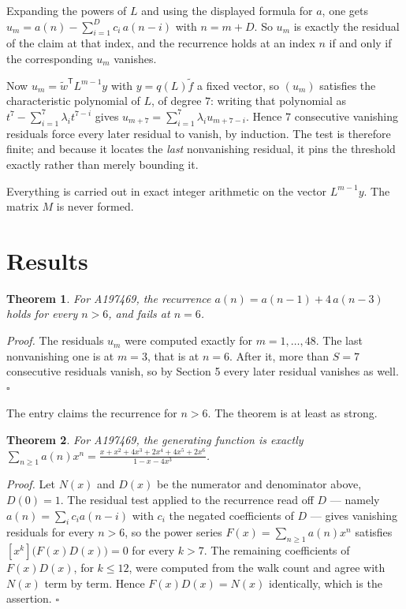 \documentclass[11pt]{article}
\newtheorem{theorem}{Theorem}
\theoremstyle{definition}
\begin{document}
Expanding the powers of $L$ and using the displayed formula for $a$, one gets $u_m = a(n) - \sum_{i=1}^{D} c_i\,a(n-i)$ with $n = m + D$. So $u_m$ is exactly the residual of the claim at that index, and the recurrence holds at an index $n$ if and only if the corresponding $u_m$ vanishes.

Now $u_m = \tilde w^{\mathsf T} L^{m-1} y$ with $y = q(L)\tilde f$ a fixed vector, so $(u_m)$ satisfies the characteristic polynomial of $L$, of degree $7$: writing that polynomial as $t^{7} - \sum_{i=1}^{7} \lambda_i t^{7-i}$ gives $u_{m+7} = \sum_{i=1}^{7} \lambda_i u_{m+7-i}$. Hence $7$ consecutive vanishing residuals force every later residual to vanish, by induction. The test is therefore finite; and because it locates the {\itshape last} nonvanishing residual, it pins the threshold exactly rather than merely bounding it.

Everything is carried out in exact integer arithmetic on the vector $L^{m-1}y$. The matrix $M$ is never formed.

\section{Results}

\begin{theorem} For A197469, the recurrence $a(n) = a(n-1) + 4\,a(n-3)$ holds for every $n > 6$, and fails at $n = 6$.\end{theorem}

{\itshape Proof.} The residuals $u_m$ were computed exactly for $m = 1,\dots,48$. The last nonvanishing one is at $m = 3$, that is at $n = 6$. After it, more than $S = 7$ consecutive residuals vanish, so by Section 5 every later residual vanishes as well. $\square$

The entry claims the recurrence for $n > 6$. The theorem is at least as strong.

\begin{theorem} For A197469, the generating function is exactly $\sum_{n\ge 1} a(n)x^n = \frac{x + x^{2} + 4x^{3} + 2x^{4} + 4x^{5} + 2x^{6}}{1 - x - 4x^{3}}$.\end{theorem}

{\itshape Proof.} Let $N(x)$ and $D(x)$ be the numerator and denominator above, $D(0)=1$. The residual test applied to the recurrence read off $D$ --- namely $a(n) = \sum_i c_i a(n-i)$ with $c_i$ the negated coefficients of $D$ --- gives vanishing residuals for every $n > 6$, so the power series $F(x)=\sum_{n\ge 1}a(n)x^n$ satisfies $[x^k]\bigl(F(x)D(x)\bigr) = 0$ for every $k > 7$. The remaining coefficients of $F(x)D(x)$, for $k \le 12$, were computed from the walk count and agree with $N(x)$ term by term. Hence $F(x)D(x) = N(x)$ identically, which is the assertion. $\square$
\end{document}
